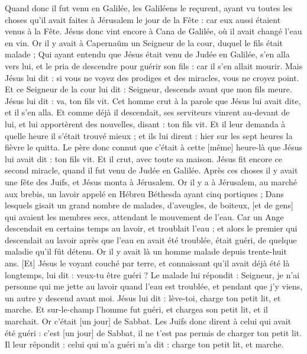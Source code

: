 \begin{multicols}{2}
Quand donc il fut venu en Galilée, les Galiléens le reçurent, ayant vu toutes les choses qu'il avait faites à Jérusalem le jour de la Fête : car eux aussi étaient venus à la Fête.
Jésus donc vint encore à Cana de Galilée, où il avait changé l'eau en vin. Or il y avait à Capernaüm un Seigneur de la cour, duquel le fils était malade ;
Qui ayant entendu que Jésus était venu de Judée en Galilée, s'en alla vers lui, et le pria de descendre pour guérir son fils : car il s'en allait mourir.
Mais Jésus lui dit : si vous ne voyez des prodiges et des miracles, vous ne croyez point.
Et ce Seigneur de la cour lui dit : Seigneur, descends avant que mon fils meure.
Jésus lui dit : va, ton fils vit. Cet homme crut à la parole que Jésus lui avait dite, et il s'en alla.
Et comme déjà il descendait, ses serviteurs vinrent au-devant de lui, et lui apportèrent des nouvelles, disant : ton fils vit.
Et il leur demanda à quelle heure il s'était trouvé mieux ; et ils lui dirent : hier sur les sept heures la fièvre le quitta.
Le père donc connut que c'était à cette [même] heure-là que Jésus lui avait dit : ton fils vit. Et il crut, avec toute sa maison.
Jésus fit encore ce second miracle, quand il fut venu de Judée en Galilée.
\VerseOne{}Après ces choses il y avait une fête des Juifs, et Jésus monta à Jérusalem.
Or il y a à Jérusalem, au marché aux brebis, un lavoir appelé en Hébreu Béthesda ayant cinq portiques ;
Dans lesquels gisait un grand nombre de malades, d'aveugles, de boiteux, [et de gens] qui avaient les membres secs, attendant le mouvement de l'eau.
Car un Ange descendait en certains temps au lavoir, et troublait l'eau ; et alors le premier qui descendait au lavoir après que l'eau en avait été troublée, était guéri, de quelque maladie qu'il fût détenu.
Or il y avait là un homme malade depuis trente-huit ans.
[Et] Jésus le voyant couché par terre, et connaissant qu'il avait déjà été là longtemps, lui dit : veux-tu être guéri ?
Le malade lui répondit : Seigneur, je n'ai personne qui me jette au lavoir quand l'eau est troublée, et pendant que j'y viens, un autre y descend avant moi.
Jésus lui dit : lève-toi, charge ton petit lit, et marche.
Et sur-le-champ l'homme fut guéri, et chargea son petit lit, et il marchait. Or c'était [un jour] de Sabbat.
Les Juifs donc dirent à celui qui avait été guéri : c'est [un jour] de Sabbat, il ne t'est pas permis de charger ton petit lit.
Il leur répondit : celui qui m'a guéri m'a dit : charge ton petit lit, et marche.

\end{multicols}
